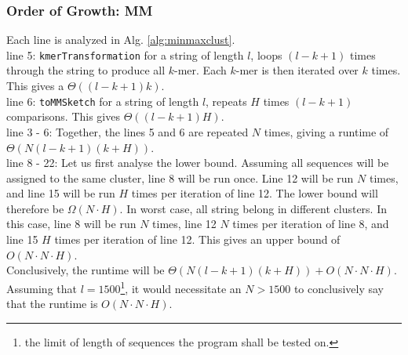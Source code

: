 \documentclass[../../main.tex]{subfiles}
\begin{document}
\subsubsection{Order of Growth: MM}
Each line is analyzed in Alg. \ref{alg:minmaxclust}.\\
line 5: \texttt{kmerTransformation} for a string of length $l$, loops $(l - k + 1)$ times through the string to produce all $k$-mer. Each $k$-mer is then iterated over $k$ times. This gives a $\Theta((l-k+1)k)$.\\
line 6: \texttt{toMMSketch} for a string of length $l$, repeats $H$ times $(l-k+1)$ comparisons. This gives $\Theta((l-k+1)H)$.\\
line 3 - 6: Together, the lines 5 and 6 are repeated $N$ times, giving a runtime of $\Theta(N (l-k+1)(k + H))$.\\
line 8 - 22: Let us first analyse the lower bound. Assuming all sequences will be assigned to the same cluster, line 8 will be run once. Line 12 will be run $N$ times, and line 15 will be run $H$ times per iteration of line 12. The lower bound will therefore be $\Omega(N\cdot H)$. In worst case, all string belong in different clusters. In this case, line 8 will be run $N$ times, line 12 $N$ times per iteration of line 8, and line 15 $H$ times per iteration of line 12. This gives an upper bound of $O(N\cdot N\cdot H)$.\\

Conclusively, the runtime will be $\Theta(N (l-k+1)(k + H)) + O(N\cdot N\cdot H)$. Assuming that $l=1500$\footnote{the limit of length of sequences the program shall be tested on.}, it would necessitate an $N>1500$ to conclusively say that the runtime is $O(N\cdot N\cdot H)$.
\end{document}
